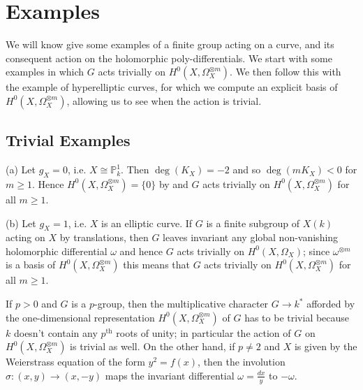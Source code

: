 \documentclass[draft, 11pt]{article} %
\theoremstyle{plain}
\theoremstyle{remark}
\begin{document}
\newpage

\section{Examples}
We will know give some examples of a finite group acting on a curve, and its consequent action on the holomorphic poly-differentials. 
We start with some examples in which $G$ acts trivially on $H^0(X,\Omega_X^{\otimes m})$.
We then follow this with the example of hyperelliptic curves, for which we compute an explicit basis of $H^0(X,\Omega_X^{\otimes m})$, allowing us to see when the action is trivial.


\subsection{Trivial Examples}\label{examplessection}

\begin{comment}
  (a) If $g_X = 0$ then $\deg(K_X)=-2$ and so $\deg(mK_X)<0$ for $m\geq1$. 
  Hence it follows that $H^0(X,\Omega_X^{\otimes m}) = \{0\}$ and $G$ acts trivially for all $m\geq 1$.

  
  (b) Suppose $g_X =1 $ (i.e. $X$ is an elliptic curve) and that $G$ is a finite subgroup of $X(k)$ acting on $X$ by translations.
  Then $G$ leaves invariant any global non-vanishing holomorphic differential $\omega$ and hence $G$ acts trivially on $H^0(X,\Omega_X)$.
  Since $\omega^{\otimes m}$ is a basis of $H^0(X,\Omega_X^{\otimes m})$, this means that $G$ also acts trivially on  $H^0(X,\Omega_X^{\otimes m})$.
\end{comment}

(a) Let $g_X = 0$, i.e. $X\cong \mathbb P_k^1$.
Then $\deg(K_X) = -2$ and so $\deg(mK_X) < 0$ for $m\geq 1$.
Hence $H^0(X,\Omega_X^{\otimes m}) =\{0\}$ by \cite[Lem. 2, pg. 295]{hart} and $G$ acts trivially on $H^0(X,\Omega_X^{\otimes m})$ for all $m\geq 1$.

(b) Let $g_X = 1$, i.e. $X$ is an elliptic curve.
If $G$ is a finite subgroup of $X(k)$ acting on $X$ by translations, then $G$ leaves invariant any global non-vanishing holomorphic differential $\omega$ and hence $G$ acts trivially on $H^0(X,\Omega_X)$;
since $\omega^{\otimes m}$ is a basis of $H^0(X,\Omega_X^{\otimes m})$ this means that $G$ acts trivially on $H^0(X,\Omega_X^{\otimes m})$ for all $m\geq 1$.

If $p>0$ and $G$ is a $p$-group, then the multiplicative character $G\rightarrow k^*$ afforded by the one-dimensional representation $H^0(X,\Omega_X^{\otimes m})$ of $G$ has to be trivial because $k$ doesn't contain any $p^{\mbox{th}}$ roots of unity;
in particular the action of $G$ on $H^0(X,\Omega_X^{\otimes m})$ is trivial as well.
On the other hand, if $p\neq 2$ and $X$ is given by the Weierstrass equation of the form $y^2 = f(x)$, then the involution $\sigma : (x,y) \rightarrow (x,-y)$ maps the invariant differential $\omega = \frac{dx}{y}$ to $-\omega$.
  
\end{document}
